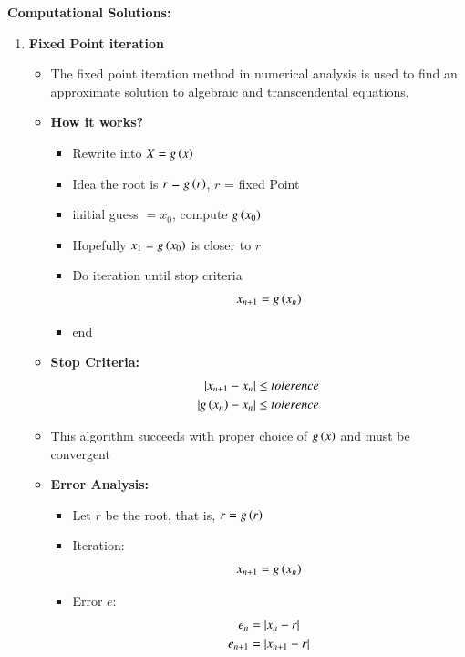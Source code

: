 \documentclass[journal]{IEEEtran}
\numberwithin{equation}{enumi}
\numberwithin{figure}{enumi}
\begin{document}
\newpage
\textbf{Computational Solutions:}
\begin{enumerate}
    \item \textbf{Fixed Point iteration}
    \begin{itemize}
        \item The fixed point iteration method in numerical analysis is used to find an approximate solution to algebraic and transcendental equations.
        \item \textbf{How it works?}
        \begin{itemize}
            \item Rewrite into $X = g\left(x\right)$
            \item Idea the root is $r = g\left(r\right)$, $r$ = fixed Point
            \item initial guess $= x_0$, compute $g\left(x_0\right)$
            \item Hopefully $x_1 = g\left(x_0\right)$ is closer to $r$ 
            \item Do iteration until stop criteria
            \begin{align}
                x_{n + 1} = g\left(x_n\right)
            \end{align}
            \item end
        \end{itemize}
        \item \textbf{Stop Criteria:}
        \begin{align}
            \left\vert x_{n + 1} - x_n\right\vert \leq tolerence\\
            \left\vert g\left(x_n\right) - x_n\right\vert \leq tolerence
        \end{align}
        \item This algorithm succeeds with proper choice of $g\left(x\right)$ and must be convergent 
        \item \textbf{Error Analysis:}
        \begin{itemize}
            \item Let $r$ be the root, that is, $r = g\left(r\right)$ 
            \item Iteration: 
            \begin{align}
                x_{n + 1} = g\left(x_n\right)
            \end{align}
            \item Error $e$:
            \begin{align}
                e_n &= \abs{x_n - r}\\
                e_{n + 1} &= \abs{x_{n + 1} - r}\\

\end{align}
\end{itemize}
\end{itemize}
\end{enumerate}
\end{document}
